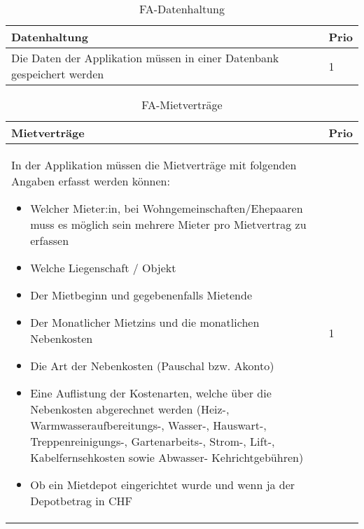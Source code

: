 \begin{table}[H]
  \centering
  \settowidth{}
  \setlength\extrarowheight{2pt}
  \begin{tabulary}{1.0\textwidth}{|m{16cm}|L|}
    \hline
    \textbf{Datenhaltung}&\textbf{Prio}\\
    \hline
      Die Daten der Applikation müssen in einer Datenbank gespeichert werden & 1\\
    \hline
  \end{tabulary}
  \caption{FA-Datenhaltung}
  \label{faDatenhaltung}
\end{table}

\begin{table}[H]
  \centering
  \settowidth{}
  \setlength\extrarowheight{2pt}
  \begin{tabulary}{1.0\textwidth}{|m{16cm}|L|}
    \hline
    \textbf{Mietverträge}&\textbf{Prio}\\
    \hline
    In der Applikation müssen die Mietverträge mit folgenden Angaben erfasst werden können:
    \begin{itemize}
      \item Welcher Mieter:in, bei Wohngemeinschaften/Ehepaaren muss es möglich sein mehrere Mieter pro Mietvertrag zu erfassen
      \item Welche Liegenschaft / Objekt
      \item Der Mietbeginn und gegebenenfalls Mietende
      \item Der Monatlicher Mietzins und die monatlichen Nebenkosten
      \item Die Art der Nebenkosten (Pauschal bzw. Akonto)
      \item Eine Auflistung der Kostenarten, welche über die Nebenkosten abgerechnet werden (Heiz-, Warmwasseraufbereitungs-, Wasser-, Hauswart-, Treppenreinigungs-, Gartenarbeits-, Strom-, Lift-, Kabelfernsehkosten sowie Abwasser- Kehrichtgebühren)
      \item Ob ein Mietdepot eingerichtet wurde und wenn ja der Depotbetrag in CHF
    \end{itemize}  & 1\\ 
    \hline
  \end{tabulary}
  \caption{FA-Mietverträge}
  \label{faMietverträge}
\end{table}


